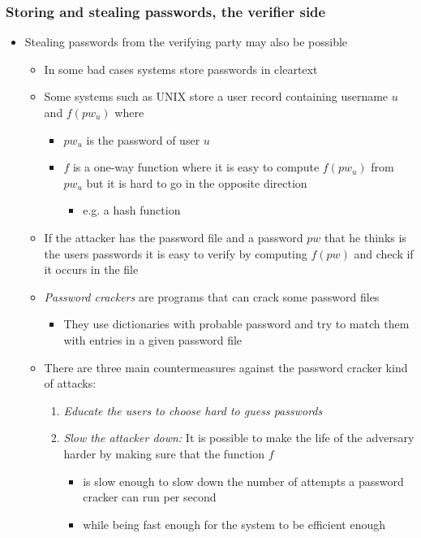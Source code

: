 \documentclass[11pt]{article}
\begin{document}
\subsubsection{Storing and stealing passwords, the verifier side}
\label{sec:org89e5f1c}
\begin{itemize}
\item Stealing passwords from the verifying party may also be possible
\begin{itemize}
\item In some bad cases systems store passwords in cleartext
\item Some systems such as UNIX store a user record containing username \(u\) and \(f(pw_u)\) where
\begin{itemize}
\item \(pw_u\) is the password of user \(u\)
\item \(f\) is a one-way function where it is easy to compute \(f(pw_u)\) from \(pw_u\) but it is hard to go in the opposite direction
\begin{itemize}
\item e.g. a hash function
\end{itemize}
\end{itemize}
\item If the attacker has the password file and a password \(pw\) that he thinks is the users passwords it is easy to verify by computing \(f(pw)\) and check if it occurs in the file
\item \emph{Password crackers} are programs that can crack some password files
\begin{itemize}
\item They use dictionaries with probable password and try to match them with entries in a given password file
\end{itemize}
\item There are three main countermeasures against the password cracker kind of attacks:
\begin{enumerate}
\item \emph{Educate the users to choose hard to guess passwords}
\item \emph{Slow the attacker down:} It is possible to make the life of the adversary harder by making sure that the function \(f\)
\begin{itemize}
\item is slow enough to slow down the number of attempts a password cracker can run per second
\item while being fast enough for the system to be efficient enough

\end{itemize}
\end{enumerate}
\end{itemize}
\end{itemize}
\end{document}
